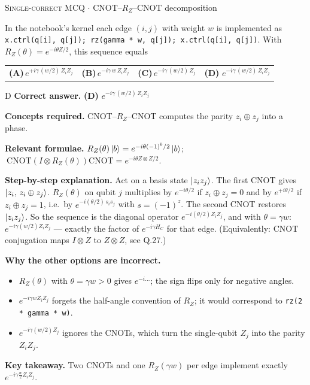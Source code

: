 \documentclass[11pt,a4paper]{article}
\newcommand{\optlabel}[1]{\textbf{(#1)}}
\newcommand{\correctlabel}[1]{\textcolor{okgreen}{\textbf{(#1)}\,\ding{51}}}
\newenvironment{qitem}[1]{\begin{list}{}{\setlength{\leftmargin}{3.3em}\setlength{\labelwidth}{3.1em}%
  \setlength{\labelsep}{0.2em}\setlength{\topsep}{3pt}\setlength{\parsep}{3pt}}\item[\textbf{Q.#1}\hfill]}{\end{list}}
\newcommand{\qsep}{\par\vspace{2pt}{\color{black!15}\hrule}\vspace{4pt}}
\newcommand{\qmeta}[2]{{\footnotesize\color{black!60}\textsc{#1} \;$\cdot$\; #2}\par}
\begin{document}
\begin{qitem}{43}
\qmeta{Single-correct MCQ}{CNOT--$R_Z$--CNOT decomposition}
In the notebook's kernel each edge $(i, j)$ with weight $w$ is implemented as
\texttt{x.ctrl(q[i], q[j]); rz(gamma * w, q[j]); x.ctrl(q[i], q[j])}. With $R_Z(\theta) = e^{-i\theta Z/2}$, this sequence equals
\par\smallskip\noindent\begin{tabularx}{\linewidth}{@{}*{4}{L}@{}}
\optlabel{A}\,$e^{+i\gamma\,(w/2)\,Z_iZ_j}$ & \optlabel{B}\,$e^{-i\gamma\, w\, Z_iZ_j}$ & \optlabel{C}\,$e^{-i\gamma\,(w/2)\,Z_j}$ & \correctlabel{D}\,$e^{-i\gamma\,(w/2)\,Z_iZ_j}$
\end{tabularx}
\end{qitem}
\begin{solbox}{D}
\textbf{\color{brand}Correct answer.} \textcolor{okgreen}{\textbf{(D)}} $e^{-i\gamma\,(w/2)\,Z_iZ_j}$

\textbf{\color{brand}Concepts required.} CNOT--$R_Z$--CNOT computes the parity $z_i\oplus z_j$ into a phase.

\textbf{\color{brand}Relevant formulae.} $R_Z(\theta)\ket b = e^{-i\theta(-1)^b/2}\ket b$; $\ \mathrm{CNOT}(I\otimes R_Z(\theta))\mathrm{CNOT} = e^{-i\theta Z\otimes Z/2}$.

\textbf{\color{brand}Step-by-step explanation.} Act on a basis state $\ket{z_i z_j}$. The first CNOT gives $\ket{z_i,\, z_i\oplus z_j}$. $R_Z(\theta)$ on qubit $j$ multiplies by
$e^{-i\theta/2}$ if $z_i \oplus z_j = 0$ and by $e^{+i\theta/2}$ if $z_i \oplus z_j = 1$, i.e.\ by $e^{-i(\theta/2)\, s_is_j}$ with $s = (-1)^z$.
The second CNOT restores $\ket{z_iz_j}$. So the sequence is the diagonal operator $e^{-i(\theta/2)Z_iZ_j}$, and with
$\theta = \gamma w$: $e^{-i\gamma(w/2)Z_iZ_j}$ --- exactly the factor of $e^{-i\gamma H_C}$ for that edge. (Equivalently: CNOT
conjugation maps $I\otimes Z$ to $Z\otimes Z$, see Q.27.)

\textbf{\color{brand}Why the other options are incorrect.}
\begin{itemize}[leftmargin=2.4em, itemsep=1pt, topsep=2pt]
\item[\textbf{(A)}] $R_Z(\theta)$ with $\theta = \gamma w > 0$ gives $e^{-i\dots}$; the sign flips only for negative angles.
\item[\textbf{(B)}] $e^{-i\gamma wZ_iZ_j}$ forgets the half-angle convention of $R_Z$; it would correspond to \texttt{rz(2 * gamma * w)}.
\item[\textbf{(C)}] $e^{-i\gamma(w/2)Z_j}$ ignores the CNOTs, which turn the single-qubit $Z_j$ into the parity $Z_iZ_j$.
\end{itemize}
\textbf{\color{brand}Key takeaway.} Two CNOTs and one $R_Z(\gamma w)$ per edge implement exactly $e^{-i\gamma\frac w2Z_iZ_j}$.
\end{solbox}
\qsep
\end{document}
